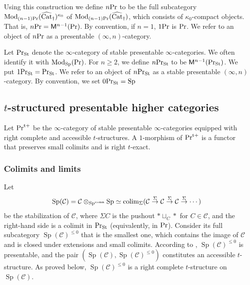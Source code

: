 \documentclass[leqno,12pt]{amsart}
\theoremstyle{plain}
\theoremstyle{definition}
\newcommand{\CCC}{\mathcal{C}}
\newcommand{\PR}{\textup{Pr}}
\newcommand{\PRTT}{\textup{Pr}^{\textup{t}+}}
\newcommand{\SP}{\operatorname{Sp}}
\newcommand{\SPC}{\operatorname{Sp}^{\textup{conn}}}
\newcommand{\Mod}{\operatorname{Mod}}
\newcommand{\colim}{\operatorname{colim}}
\newcommand{\vCat}{\widehat{\operatorname{Cat}}_\dagger}
\newcommand{\PRST}{\PR_{\textup{St}}}
\begin{document}
Using this construction
we define $n\PR$ to be the full subcategory $\Mod_{(n-1)\PR}(\vCat)^{\kappa_0}$ of $\Mod_{(n-1)\PR}(\vCat)$,
which consists of $\kappa_0$-compact objects. That is, $n\PR=\mathsf{M}^{n-1}(\PR)$.
By convention, if $n=1$, $1\PR$ is $\PR$.
We refer to an object of $n\PR$ as a presentable $(\infty,n)$-category.





Let $\PRST$ denote the $\infty$-category of stable presentable $\infty$-categories. 
We often identify it with $\Mod_{\SP}(\PR)$.
For $n\ge2$,
we define $n\PRST$ to be $\mathsf{M}^{n-1}(\PRST)$. 
We put $1\PRST=\PRST$.
We refer to an object of $n\PRST$ as a stable presentable $(\infty,n)$-category.
By convention, we set $0\PRST=\SP$

























\subsection{$t$-structured presentable higher categories}



Let $\PRTT$ be the $\infty$-category of stable presentable $\infty$-categories equipped with right complete and accessible $t$-structures.
A $1$-morphism of $\PRTT$ is a functor that preserves small colimits and is right $t$-exact.

\subsubsection{Colimits and limits}
Let
\[
\SP(\CCC)=\CCC\otimes_{\SPC}\SP\simeq \colim_{\Sigma}(\CCC\stackrel{\Sigma}{\to} \CCC  \stackrel{\Sigma}{\to} \CCC \stackrel{\Sigma}{\to}\cdots ) 
\]
be the stabilization of $\CCC$, where $\Sigma C$ is the pushout $\ast\sqcup_{C}\ast$ for $C\in \CCC$, and the right-hand side is a colimit in $\PRST$ (equivalently, in $\PR$).
Consider 
its full subcategory $\SP(\CCC)^{\le0}$ that is the smallest one, which contains the image of $\CCC$ and is closed under extensions and small colimits.
According to \cite[1.4.3.4]{HA}, $\SP(\CCC)^{\le0}$ is presentable, and the pair $(\SP(\CCC),\SP(\CCC)^{\le0})$ constitutes 
an accessible $t$-structure.
As proved below, $\SP(\CCC)^{\le0}$ is a right complete $t$-structure on $\SP(\CCC)$.
\end{document}
